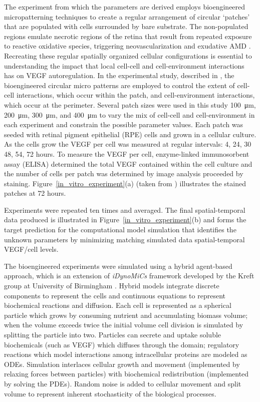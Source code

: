 
The experiment from which the parameters are derived employs bioengineered micropatterning techniques
to create a regular arrangement of circular ‘patches’ that are populated with cells surrounded by bare substrate. The non-populated regions emulate necrotic regions of the retina that result from repeated exposure to reactive oxidative species, triggering neovascularization and exudative AMD \cite{Chopdar2003Age}.  Recreating these regular spatially organized cellular configurations is essential to understanding the impact that local cell-cell and cell-environment interactions has on VEGF autoregulation. In the experimental study, described in \cite{qanitabaker:Vargis2014Effect}, the bioengineered circular micro patterns are employed to control the extent of cell-cell interactions, which occur within the patch, and cell-environment interactions, which occur at the perimeter. Several patch sizes were used in this study \SI{100}{\micro\metre}, \SI{200}{\micro\metre}, \SI{300}{\micro\metre}, and \SI{400}{\micro\metre} to vary the mix of cell-cell and cell-environment in each experiment and constrain the possible parameter values. Each patch was seeded with retinal pigment epithelial (RPE) cells and grown in a cellular culture. As the cells grow the VEGF per cell was measured at regular intervals: 4, 24, 30 48, 54, 72 hours. To measure the VEGF per cell, enzyme-linked immunosorbent assay (ELISA) determined the total VEGF contained within the cell culture and the number of cells per patch was determined by image analysis proceeded by staining. Figure~\ref{in_vitro_experiment}(a) (taken from \cite{qanitabaker:Vargis2014Effect}) illustrates the stained patches at 72 hours.

Experiments were repeated ten times and averaged. The final spatial-temporal data produced is illustrated in Figure~\ref{in_vitro_experiment}(b) and forms the target prediction for the computational model simulation that identifies the unknown parameters by minimizing matching simulated data spatial-temporal VEGF/cell levels.

The bioengineered experiments were simulated using a hybrid agent-based approach, which is an extension of \textsl{iDynoMiCs} framework developed by the Kreft group at University of Birmingham \cite{qanitabaker:Lardon2011IDynoMiCS}. Hybrid models integrate discrete components to represent the cells and continuous equations to represent biochemical reactions and diffusion. Each cell is represented as a spherical particle which grows by consuming nutrient and accumulating biomass volume; when the volume exceeds twice the initial volume cell division is simulated by splitting the particle into two. Particles can secrete and uptake soluble biochemicals (such as VEGF) which diffuses through the domain; regulatory reactions which model interactions among intracellular proteins are modeled as ODEs. Simulation interlaces cellular growth and movement (implemented by relaxing forces between particles) with biochemical redistribution (implemented by solving the PDEs). Random noise is added to cellular movement and split volume to represent inherent stochasticity of the biological processes.

